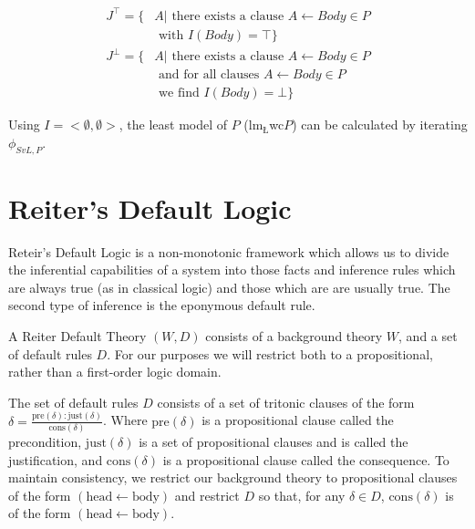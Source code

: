 \[
\begin{split}
J^\top = \{ & A | \textrm{ there exists a clause } A\leftarrow Body \in P \\ & \textrm{ with } I(Body) = \top\}
\end{split}
\]
\[
\begin{split}
J^\bot = \{ &  A | \textrm{ there exists a clause } A \leftarrow Body \in P \\
           & \textrm{ and for all clauses } A \leftarrow Body \in P \\ & \textrm{ we find } I(Body) = \bot\}
\end{split}
\]

Using $I=<\emptyset, \emptyset>$, the least model of $P$ ($\textrm{lm}_\textrm{\L}$wc$P$) can be calculated by iterating $\phi_{SvL,P}$.

\section{Reiter's Default Logic} \label{ssec:reiter}
Reteir's Default Logic \citep{reiter1980logic} is a non-monotonic framework which allows us to divide the inferential capabilities of a system into those facts and inference rules which are always true (as in classical logic) and those which are are usually true. The second type of inference is the eponymous default rule.

A Reiter Default Theory $(W,D)$ consists of a background theory $W$, and a set of default rules
$D$. For our purposes we will restrict both to a propositional, rather than a first-order logic domain. 

The set of default rules $D$ consists of a set of tritonic clauses of the form $\delta=\frac{\text{pre}(\delta):\text{just}(\delta)}{\text{cons}(\delta)}$. Where $\text{pre}(\delta)$ is a propositional clause called the precondition, $\text{just}(\delta)$ is a set of propositional clauses and is called the justification, and $\text{cons}(\delta)$ is a propositional clause called the consequence. To maintain consistency, we restrict our background theory to propositional clauses of the form $(\text{head}\leftarrow \text{body})$ and restrict $D$ so that, for any $\delta \in D$, $\text{cons}(\delta)$ is of the form $(\text{head}\leftarrow \text{body})$.%


